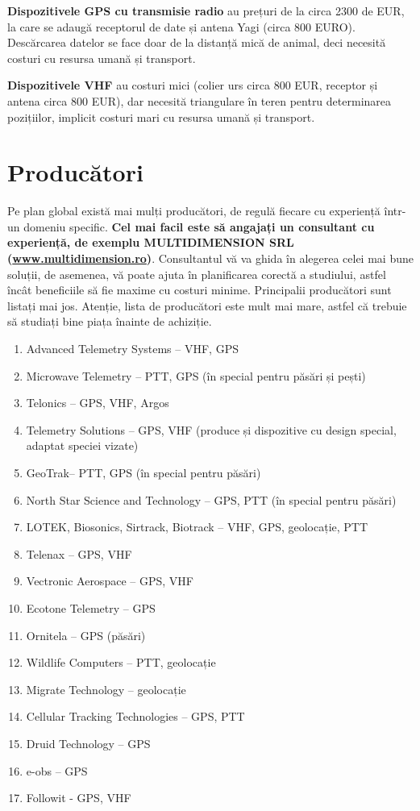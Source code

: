 \documentclass[11pt,onehalfspacing]{elife}
\begin{document}
\textbf{Dispozitivele GPS cu transmisie radio} au prețuri de la circa 2300 de EUR, la care se adaugă receptorul de date și antena Yagi (circa 800 EURO). Descărcarea datelor se face doar de la distanță mică de animal, deci necesită costuri cu resursa umană și transport.

\textbf{Dispozitivele VHF} au costuri mici (colier urs circa 800 EUR, receptor și antena circa 800 EUR), dar necesită triangulare în teren pentru determinarea pozițiilor, implicit costuri mari cu resursa umană și transport.

\section{Producători}
Pe plan global există mai mulți producători, de regulă fiecare cu experiență într-un domeniu specific. \textbf{Cel mai facil este să angajați un consultant cu experiență, de exemplu MULTIDIMENSION SRL (\url{www.multidimension.ro})}. Consultantul vă va ghida în alegerea celei mai bune soluții, de asemenea, vă poate ajuta în planificarea corectă a studiului, astfel încât beneficiile să fie maxime cu costuri minime. Principalii producători sunt listați mai jos. Atenție, lista de producători este mult mai mare, astfel că trebuie să studiați bine piața înainte de achiziție.
\begin{enumerate}
\item Advanced Telemetry Systems – VHF, GPS
\item Microwave Telemetry – PTT, GPS (în special pentru păsări și pești)
\item Telonics – GPS, VHF, Argos
\item Telemetry Solutions – GPS, VHF (produce și dispozitive cu design special, adaptat speciei vizate)
\item GeoTrak– PTT, GPS (în special pentru păsări)
\item North Star Science and Technology – GPS, PTT (în special pentru păsări)
\item LOTEK, Biosonics, Sirtrack, Biotrack – VHF, GPS, geolocație, PTT
\item Telenax – GPS, VHF
\item Vectronic Aerospace – GPS, VHF
\item Ecotone Telemetry – GPS
\item Ornitela – GPS (păsări)
\item Wildlife Computers – PTT, geolocație
\item Migrate Technology – geolocație
\item Cellular Tracking Technologies – GPS, PTT
\item Druid Technology – GPS
\item e-obs – GPS
\item Followit - GPS, VHF
\end{enumerate}
\end{document}
